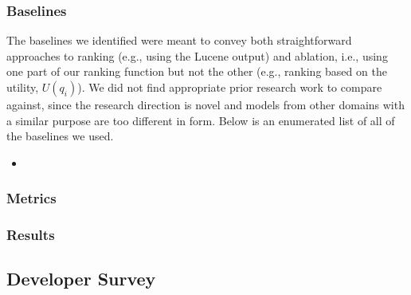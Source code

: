 \subsubsection{Baselines}
The baselines we identified were meant to convey both straightforward approaches to ranking (e.g., using the Lucene output) and
ablation, i.e., using one part of our ranking function but not the other (e.g., ranking based on the utility, $U(q_{i})$). We did not
find appropriate prior research work to compare against, since the research direction is novel and models from other domains with a similar
purpose are too different in form. Below is an enumerated list of all of the baselines we used.
\begin{itemize}
\item 
\end{itemize}

\subsubsection{Metrics}


\subsubsection{Results}


\subsection{Developer Survey}
